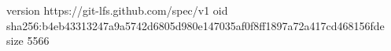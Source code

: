 version https://git-lfs.github.com/spec/v1
oid sha256:b4eb43313247a9a5742d6805d980e147035af0f8ff1897a72a417cd468156fde
size 5566
